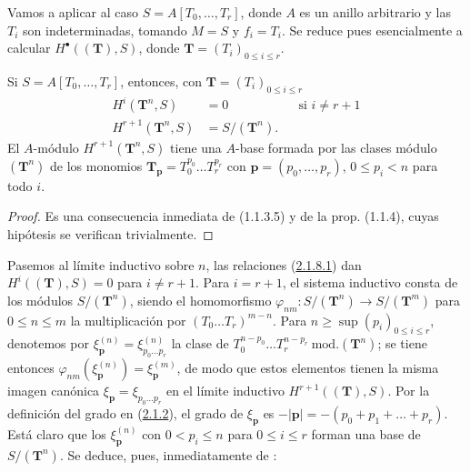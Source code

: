 \begin{env}[2.1.7]
\label{III.2.1.7}
\label{III.2.1.7-fr}

Vamos a aplicar  al caso $S=A[T_0,\ldots,T_r]$, donde $A$ es un anillo arbitrario y las $T_i$ son indeterminadas, tomando $M=S$ y $f_i=T_i$. Se reduce pues esencialmente a calcular $H^\bullet((\mathbf T),S)$, donde $\mathbf T=(T_i)_{0\leq i\leq r}$.
\end{env}

\begin{lemma}[2.1.8]
\label{III.2.1.8}
\label{III.2.1.8-fr}
Si $S=A[T_0,\ldots,T_r]$, entonces, con $\mathbf T=(T_i)_{0\leq i\leq r}$
\begin{align}
\label{III.2.1.8.1-fr}
\tag{2.1.8.1}
H^i(\mathbf T^n,S)&=0 &&\text{si }i\neq r+1\\
\label{III.2.1.8.2-fr}
\tag{2.1.8.2}
H^{r+1}(\mathbf T^n,S)&=S/(\mathbf T^n).
\end{align}
El $A$-módulo $H^{r+1}(\mathbf T^n,S)$ tiene una $A$-base formada por las clases módulo $(\mathbf T^n)$ de los monomios
$\mathbf T_{\mathbf p}=T_0^{p_0}\ldots T_r^{p_r}$ con
$\mathbf p=(p_0,\ldots,p_r)$, $0\leq p_i<n$ para todo $i$.
\end{lemma}

\begin{proof}
Es una consecuencia inmediata de (1.1.3.5) y de la prop. (1.1.4), cuyas
hipótesis se verifican trivialmente.
\end{proof}

\begin{env}[2.1.9]
\label{III.2.1.9-fr}
Pasemos al límite inductivo sobre $n$, las relaciones (\hyperref[III.2.1.8.1]{2.1.8.1}) dan $H^i((\mathbf T),S)=0$ para $i\neq r+1$.
Para $i=r+1$, el sistema inductivo consta de los módulos $S/(\mathbf T^n)$, siendo el homomorfismo
$\varphi_{nm}:S/(\mathbf T^n)\longrightarrow S/(\mathbf T^m)$
para $0\leq n\leq m$
la multiplicación por $(T_0\ldots T_r)^{m-n}$.
Para $n\geq\sup(p_i)_{0\leq i\leq r}$, denotemos por $\xi_{\mathbf p}^{(n)}=\xi_{p_0\ldots p_r}^{(n)}$ la clase de
$T_0^{n-p_0}\ldots T_r^{n-p_r}\ \mathrm{mod.}(\mathbf T^n)$; se tiene entonces
$\varphi_{nm}(\xi_{\mathbf p}^{(n)})=\xi_{\mathbf p}^{(m)}$, de modo que estos elementos tienen la misma imagen canónica $\xi_{\mathbf p}=\xi_{p_0\ldots p_r}$ en el límite inductivo $H^{r+1}((\mathbf T),S)$.
Por la definición del grado en (\hyperref[III.2.1.2]{2.1.2}), el grado de $\xi_{\mathbf p}$ es $-|\mathbf p|=-(p_0+p_1+\ldots+p_r)$.
Está claro que los $\xi_{\mathbf p}^{(n)}$ con $0<p_i\leq n$ para $0\leq i\leq r$ forman una base de $S/(\mathbf T^n)$.
Se deduce, pues, inmediatamente de :
\end{env}

